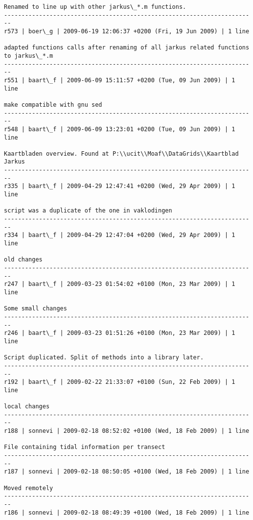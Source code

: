 \documentclass[9]{report}
\begin{document}
\begin{description}
\begin{verbatim}
Renamed to line up with other jarkus\_*.m functions.
------------------------------------------------------------------------
r573 | boer\_g | 2009-06-19 12:06:37 +0200 (Fri, 19 Jun 2009) | 1 line

adapted functions calls after renaming of all jarkus related functions to jarkus\_*.m
------------------------------------------------------------------------
r551 | baart\_f | 2009-06-09 15:11:57 +0200 (Tue, 09 Jun 2009) | 1 line

make compatible with gnu sed
------------------------------------------------------------------------
r548 | baart\_f | 2009-06-09 13:23:01 +0200 (Tue, 09 Jun 2009) | 1 line

Kaartbladen overview. Found at P:\\ucit\\Moaf\\DataGrids\\Kaartblad Jarkus
------------------------------------------------------------------------
r335 | baart\_f | 2009-04-29 12:47:41 +0200 (Wed, 29 Apr 2009) | 1 line

script was a duplicate of the one in vaklodingen
------------------------------------------------------------------------
r334 | baart\_f | 2009-04-29 12:47:04 +0200 (Wed, 29 Apr 2009) | 1 line

old changes
------------------------------------------------------------------------
r247 | baart\_f | 2009-03-23 01:54:02 +0100 (Mon, 23 Mar 2009) | 1 line

Some small changes
------------------------------------------------------------------------
r246 | baart\_f | 2009-03-23 01:51:26 +0100 (Mon, 23 Mar 2009) | 1 line

Script duplicated. Split of methods into a library later. 
------------------------------------------------------------------------
r192 | baart\_f | 2009-02-22 21:33:07 +0100 (Sun, 22 Feb 2009) | 1 line

local changes
------------------------------------------------------------------------
r188 | sonnevi | 2009-02-18 08:52:02 +0100 (Wed, 18 Feb 2009) | 1 line

File containing tidal information per transect
------------------------------------------------------------------------
r187 | sonnevi | 2009-02-18 08:50:05 +0100 (Wed, 18 Feb 2009) | 1 line

Moved remotely
------------------------------------------------------------------------
r186 | sonnevi | 2009-02-18 08:49:39 +0100 (Wed, 18 Feb 2009) | 1 line


\end{verbatim}
\end{description}
\end{document}
